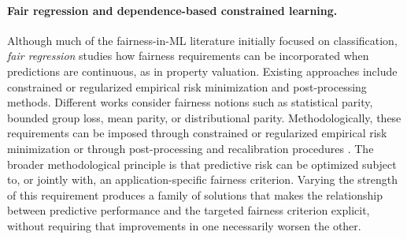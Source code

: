 \documentclass[10pt]{article}
\theoremstyle{definition}
\newcommand{\1}{\mathbf{1}}
\begin{document}
\paragraph{Fair regression and dependence-based constrained learning.}
Although much of the fairness-in-ML literature initially focused on classification, \emph{fair regression} studies how fairness requirements can be incorporated when predictions are continuous, {as in property valuation}. Existing approaches include constrained or regularized empirical risk minimization and post-processing methods. {Different works consider fairness notions such as statistical parity, bounded group loss, mean parity, or distributional parity. Methodologically, these requirements can be imposed through constrained or regularized empirical risk minimization or through post-processing and recalibration procedures} \cite{AgarwalDudikWu2019,FitzsimonsEtAl2019,ChzhenEtAl2020Wasserstein,ChzhenEtAl2020Recalibration,WeiEtAl2023}. {The broader methodological principle is that predictive risk can be optimized subject to, or jointly with, an application-specific fairness criterion. Varying the strength of this requirement produces a family of solutions that makes the relationship between predictive performance and the targeted fairness criterion explicit, without requiring that improvements in one necessarily worsen the other.}
\end{document}
